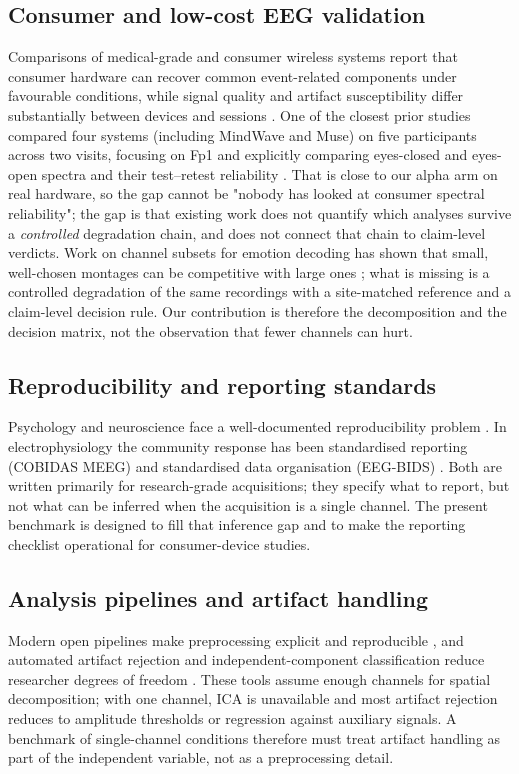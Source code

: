\subsection*{Consumer and low-cost EEG validation}
Comparisons of medical-grade and consumer wireless systems report that consumer
hardware can recover common event-related components under favourable conditions,
while signal quality and artifact susceptibility differ substantially between devices
and sessions \citep{ratti2017comparison,krigolson2017muse,sawangjai2020consumer}. One of
the closest prior studies compared four systems (including MindWave and Muse) on five
participants across two visits, focusing on Fp1 and explicitly comparing eyes-closed
and eyes-open spectra and their test--retest reliability
\citep{ratti2017comparison}. That is close to our alpha arm on real hardware, so the gap
cannot be "nobody has looked at consumer spectral reliability"; the gap is that
existing work does not quantify which analyses survive a \emph{controlled} degradation
chain, and does not connect that chain to claim-level verdicts. Work on channel subsets for emotion decoding has shown that small, well-chosen
montages can be competitive with large ones \citep{zheng2015channels}; what is missing is
a controlled degradation of the same recordings with a site-matched reference and a
claim-level decision rule. Our contribution is therefore the decomposition and the
decision matrix, not the observation that fewer channels can hurt.

\subsection*{Reproducibility and reporting standards}
Psychology and neuroscience face a well-documented reproducibility problem
\citep{osc2015reproducibility}. In electrophysiology the community response has been
standardised reporting (COBIDAS MEEG) \citep{pernet2020cobidas} and standardised data
organisation (EEG-BIDS) \citep{pernet2019bids}. Both are written primarily for
research-grade acquisitions; they specify what to report, but not what can be
inferred when the acquisition is a single channel. The present benchmark is designed
to fill that inference gap and to make the reporting checklist operational for
consumer-device studies.

\subsection*{Analysis pipelines and artifact handling}
Modern open pipelines make preprocessing explicit and reproducible
\citep{gramfort2013mne,delorme2004eeglab,oostenveld2011fieldtrip}, and automated
artifact rejection and independent-component classification reduce researcher degrees
of freedom \citep{jas2017autoreject,piontonachini2019iclabel}. These tools assume
enough channels for spatial decomposition; with one channel, ICA is unavailable and
most artifact rejection reduces to amplitude thresholds or regression against
auxiliary signals. A benchmark of single-channel conditions therefore must treat
artifact handling as part of the independent variable, not as a preprocessing detail.

